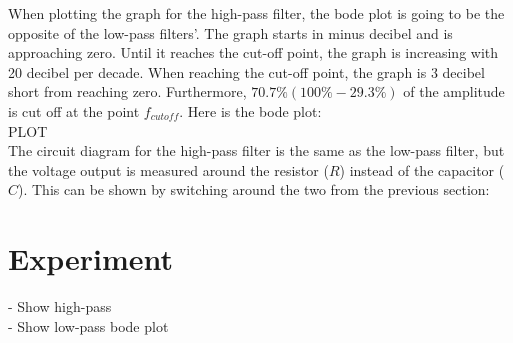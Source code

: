When plotting the graph for the high-pass filter, the bode plot is going to be the opposite of the low-pass filters'. The graph starts in minus decibel and is approaching zero. Until it reaches the cut-off point, the graph is increasing with 20 decibel per decade. When reaching the cut-off point, the graph is 3 decibel short from reaching zero. Furthermore, $70.7\% (100\%-29.3\%)$ of the amplitude is cut off at the point $f_{cutoff}$. Here is the bode plot: \\
PLOT \\
The circuit diagram for the high-pass filter is the same as the low-pass filter, but the voltage output is measured around the resistor ($R$) instead of the capacitor ($C$). This can be shown by switching around the two from the previous section:
\begin{figure}[H]
	
\end{figure}

\section{Experiment}
- Show high-pass \\
- Show low-pass bode plot
